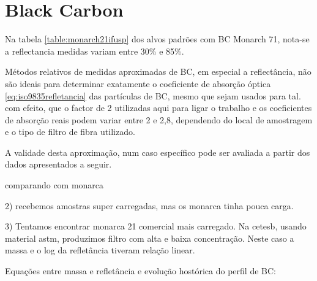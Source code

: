 \section{Black Carbon}

Na tabela \ref{table:monarch21ifusp} dos alvos padrões com BC Monarch 71, 
nota-se a reflectancia medidas variam entre 30\% e 85\%.

Métodos relativos de medidas aproximadas de BC, em especial a reflectância,  
não são ideais para determinar exatamente o coeficiente de absorção óptica 
\ref{eq:iso9835refletancia}
das partículas de BC, mesmo que sejam usados para tal.  com efeito, que o factor de 2 
utilizadas aqui para ligar o trabalho e os coeficientes de absorção reais podem
 variar entre 2 e 2,8, dependendo do local de amostragem e o tipo de filtro 
de fibra utilizado. 

A validade desta aproximação, num caso específico pode ser 
avaliada a partir dos dados apresentados a seguir. \citep{quincey2007}


comparando com monarca 





2) recebemos amostras super carregadas, mas os monarca tinha pouca carga.

3) Tentamos encontrar monarca 21 comercial mais carregado. Na cetesb,
usando material astm, produzimos filtro com alta e baixa concentração.
Neste caso a massa e o log da refletância tiveram relação linear. 

Equações entre massa e refletância e evolução hostórica do perfil de BC:

